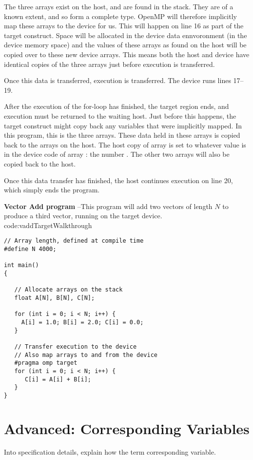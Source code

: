 The three arrays exist on the host, and are found in the stack.
They are of a known extent, and so form a complete type.
OpenMP will therefore implicitly map these arrays to the device for us.
This will happen on line 16 as part of the target construct.
Space will be allocated in the device data ennvoronment (in the device memory space) and the values of these arrays as found on the host will be copied over to these new device arrays.
This means both the host and device have identical copies of the three arrays just before execution is transferred.

Once this data is transferred, execution is transferred.
The device runs lines 17--19.

After the execution of the for-loop has finished, the target region ends, and execution must be returned to the waiting host.
Just before this happens, the target construct might copy back any variables that were implicitly mapped.
In this program, this is the three arrays.
These data held in these arrays is copied back to the arrays on the host.
The host copy of array  is set to whatever value is in the device code of array : the number .
The other two arrays will also be copied back to the host.

Once this data transfer has finished, the host continues execution on line 20, which simply ends the program.


\begin{CodeExample}%
{\textbf{Vector Add program} --\small This program will add two vectors of length $N$
to produce a third vector, running on the target device.
}%
{code:vaddTargetWalkthrough}
\begin{lstlisting}
// Array length, defined at compile time
#define N 4000;

int main()
{

   // Allocate arrays on the stack
   float A[N], B[N], C[N];

   for (int i = 0; i < N; i++) {
     A[i] = 1.0; B[i] = 2.0; C[i] = 0.0;
   }

   // Transfer execution to the device
   // Also map arrays to and from the device
   #pragma omp target
   for (int i = 0; i < N; i++) {
      C[i] = A[i] + B[i];
   }
}	  
\end{lstlisting}
\end{CodeExample}

\section{Advanced: Corresponding Variables}
Into specification details, explain how the term corresponding variable.

